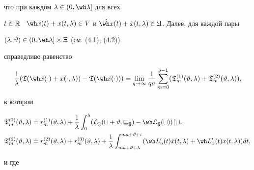 что при каждом $\lambda\in(0,\wh\lambda]$ для всех


$t\in\Bbb R$ \ $\wh x(t)+x(t,\lambda)\in V$ и $\Dot{\wh x}(t)+\Dot


x(t,\lambda)\in\frak U$. Далее, для каждой пары


$(\lambda,\vartheta)\in(0,\wh\lambda]\times\Xi$ (см. (4.1), (4.2))


справедливо равенство


\begin{equation}


\frac{1}{\lambda}(\frak T(\wh


x(\cdot)+x(\cdot,\lambda))-\frak T(\wh x(\cdot)))=


\lim_{q\to\infty}\frac{1}{qa}\sum_{m=0}^{q-


1}(\frak T_m^{(1)}(\vartheta,\lambda)+


\frak T_m^{(2)}(\vartheta,\lambda)),


\end{equation}


в котором


\begin{align}


\frak T_m^{(1)}(\vartheta,\lambda)&\doteq


r_m^{(1)}(\vartheta,\lambda)+\frac{1}{\lambda}\int_0^\lambda


(\cal L_m(t+\vartheta,v_m)-\wh L_m(t))dt,\\


\frak T_m^{(2)}(\vartheta,\lambda)&\doteq


r_m^{(2)}(\vartheta,\lambda)+r_m^{(3)}(\vartheta,\lambda)+


\frac{1}{\lambda}


\int_{ma+\vartheta+\lambda}^{ma+\vartheta+\varepsilon}


(\wh L'_u(t)\Dot x(t,\lambda)+\wh L'_x(t)x(t,\lambda))dt,


\end{align}


и где


